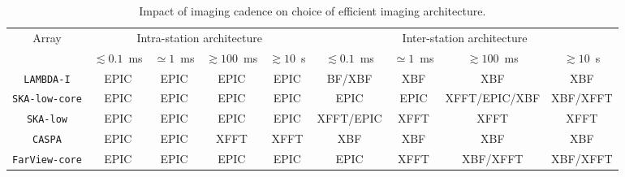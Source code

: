 \documentclass[
  journal=pasa,
  manuscript=article-type,
  year=2020,
  volume=37,
]{cup-journal}
\begin{document}
\begin{table}[htb!]
\normalsize
\begin{threeparttable}
\caption{Impact of imaging cadence on choice of efficient imaging architecture.}
\label{tab:cadence}
\begin{tabular}{c|cccc|cccc}
\toprule
\headrow 
Array & \multicolumn{4}{c|}{Intra-station architecture} & \multicolumn{4}{c}{Inter-station architecture} \\ 
 & $\lesssim 0.1$~ms & $\simeq 1$~ms & $\gtrsim 100$~ms & $\gtrsim 10$~s & $\lesssim 0.1$~ms & $\simeq 1$~ms & $\gtrsim 100$~ms & $\gtrsim 10$~s \\ 
\midrule\midrule

\texttt{LAMBDA-I} & EPIC & EPIC & EPIC & EPIC & BF/XBF & XBF & XBF & XBF \\
\midrule
\texttt{SKA-low-core} & EPIC & EPIC & EPIC & EPIC & EPIC & EPIC & XFFT/EPIC/XBF & XBF/XFFT \\
\midrule
\texttt{SKA-low} & EPIC & EPIC & EPIC & EPIC & XFFT/EPIC & XFFT & XFFT & XFFT \\
\midrule
\texttt{CASPA} & EPIC & EPIC & XFFT & XFFT & XBF & XBF & XBF & XBF \\
\midrule
\texttt{FarView-core} & EPIC & EPIC & EPIC & EPIC & EPIC & XFFT & XBF/XFFT & XBF/XFFT \\
\bottomrule
\end{tabular}
\end{threeparttable}
\end{table}
\end{document}
